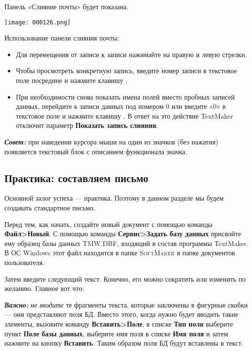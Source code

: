 ﻿\documentclass[a4paper,10pt]{article}
\begin{document}
Панель «Слияние почты» будет показана.

\texttt{[image: 000126.png]}

Использование панели слияния почты:
\begin{itemize}
 \item Для перемещения от записи к записи нажимайте на правую и левую стрелки.
 \item Чтобы просмотреть конкретную запись, введите номер записи в текстовое поле посредине и нажмите клавишу .
 \item При необходимости снова показать имена полей вместо пробных записей данных, перейдите к записи данных под номером 0 или введите «0» в текстовое поле и нажмите клавишу . В ответ на это действие TextMaker отключит параметр \textbf{Показать запись слияния}.
\end{itemize}

\begin{mdframed}[backgroundcolor=blue!10]
\textbf{\textit{Совет:}} при наведении курсора мыши на один из значков (без нажатия) появляется текстовый блок с описанием функционала значка.
\end{mdframed}

\subsection{Практика: составляем письмо}
Основной залог успеха — практика. Поэтому в данном разделе мы будем создавать стандартное письмо.

Перед тем, как начать, создайте новый документ с помощью команды \textbf{Файл>Новый}. С помощью команды \textbf{Сервис>Задать базу данных} присвойте ему образец базы данных TMW.DBF, входящий в состав программы TextMaker. В ОС Windows этот файл находится в папке \textsc{SoftMaker} в папке документов пользователя. 

Затем введите следующий текст. Конечно, его можно сократить или изменить по желанию. Главное вот что:

\textbf{\textit{Важно:}} \textit{не вводите} те фрагменты текста, которые заключены в фигурные скобки — они представляют поля БД. Вместо этого, когда нужно будет вводить такие элементы, вызовите команду \textbf{Вставить>Поле}, в списке \textbf{Тип поля} выберите пункт \textbf{Поле базы данных}, выберите имя поля в списке \textbf{Имя поля} и затем нажмите на кнопку \textbf{Вставить}. Таким образом поля БД будут вставлены в текст.
\end{document}
